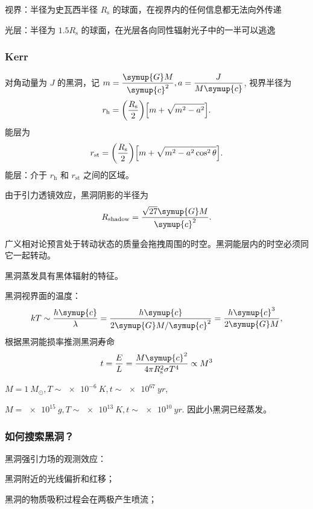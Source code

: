 \documentclass[../天体物理基础.tex]{subfiles}
\begin{document}
视界：半径为史瓦西半径 $R_{\mathrm{s}}$ 的球面，在视界内的任何信息都无法向外传递

光层：半径为 $1.5R_{\mathrm{s}}$ 的球面，在光层各向同性辐射光子中的一半可以逃逸

\subsubsection{Kerr}
对角动量为 $J$ 的黑洞，记 $m=\dfrac{\symup{G}M}{\symup{c}^{2}}, a=\dfrac{J}{M\symup{c}}$, 视界半径为
\begin{equation}
r_{\mathrm{h}}=\mleft(\frac{R_{\mathrm{s}}}{2}\mright)\mleft[m+\sqrt{m^{2}-a^{2}}\mright].
\end{equation}
能层为
\begin{equation}
r_{\mathrm{st}}=\mleft(\frac{R_{\mathrm{s}}}2\mright)\mleft[m+\sqrt{m^{2}-a^{2}\cos^{2}{\theta}}\mright].
\end{equation}
能层：介于 $r_{\mathrm{h}}$ 和 $r_{\mathrm{st}}$ 之间的区域。

由于引力透镜效应，黑洞阴影的半径为
\begin{equation}
R_{\text{shadow}}=\frac{\sqrt{27}\symup{G}M}{\symup{c}^{2}}.
\end{equation}

广义相对论预言处于转动状态的质量会拖拽周围的时空。黑洞能层内的时空必须同它一起转动。

黑洞蒸发具有黑体辐射的特征。

黑洞视界面的温度：
\begin{equation}
kT\sim\frac{h\symup{c}}{\lambda}=\frac{h\symup{c}}{2\symup{G}M/\symup{c}^{2}}=\frac{h\symup{c}^{3}}{2\symup{G}M},
\end{equation}
根据黑洞能损率推测黑洞寿命
\begin{equation}
t=\frac{E}{L}=\frac{M\symup{c}^{2}}{4\pi R_{\mathrm{s}}^{2}\sigma T^{4}}\propto{}M^{3}
\end{equation}

$M=\qty{1}{M_{\odot}}, T\sim\qty{e-6}{K}, t\sim\qty{e67}{yr}$,

$M=\qty{e15}{g}, T\sim\qty{e13}{K}, t\sim\qty{e10}{yr}$. 因此小黑洞已经蒸发。

\subsubsection{如何搜索黑洞？}
黑洞强引力场的观测效应：

黑洞附近的光线偏折和红移；

黑洞的物质吸积过程会在两极产生喷流；
\end{document}
